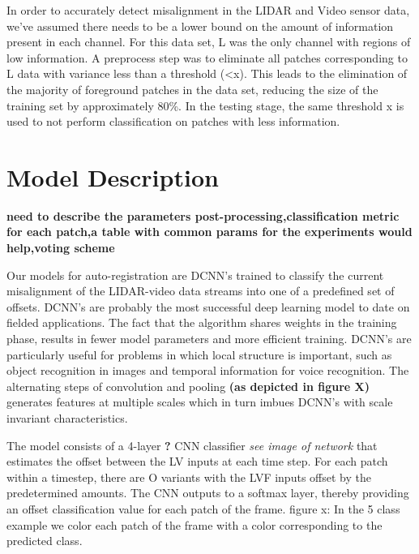 \documentclass{article}
\begin{document}


In order to accurately detect misalignment in the LIDAR and Video sensor data, we've assumed there needs to be a lower bound on the amount of information present in each channel. For this data set, L was the only channel with regions of low information. A preprocess step was to eliminate all patches corresponding to L data with variance less than a threshold (\textless x). This leads to the elimination of the majority of foreground patches in the data set, reducing the size of the training set by approximately 80\%. In the testing stage, the same threshold x is used to not perform classification on patches with less information.



\section{Model Description} %
\label{sec:model_description}

\textbf{need to describe the parameters post-processing,classification metric for each patch,a table with common params for the experiments would help,voting scheme}

Our models for auto-registration are DCNN's trained to classify the current misalignment of the LIDAR-video data streams into one of a predefined set of offsets. DCNN's are probably the most successful deep learning model to date on fielded applications. The fact that the algorithm shares weights in the training phase, results in fewer model parameters and more efficient training. DCNN's are particularly useful for problems in which local structure is important, such as object recognition in images and temporal information for voice recognition. The alternating steps of convolution and pooling \textbf{(as depicted in figure X)}  generates features at multiple scales which in turn imbues DCNN's with scale invariant characteristics.


The model consists of a 4-layer \textbf{?} CNN classifier \textit{see image of network} that estimates the offset between the LV inputs at each time step. For each patch within a timestep, there are O variants with the LVF inputs offset by the predetermined amounts. The CNN outputs to a softmax layer, thereby providing an offset classification value for each patch of the frame. 
figure x: In the 5 class example we color each patch of the frame with a color corresponding to the predicted class. 
\end{document}
